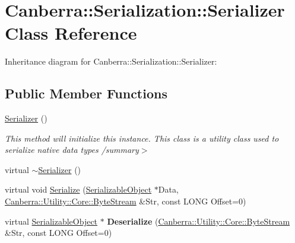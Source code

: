 \hypertarget{class_canberra_1_1_serialization_1_1_serializer}{}\section{Canberra\+:\+:Serialization\+:\+:Serializer Class Reference}
\label{class_canberra_1_1_serialization_1_1_serializer}


Inheritance diagram for Canberra\+:\+:Serialization\+:\+:Serializer\+:
\subsection*{Public Member Functions}
\begin{DoxyCompactItemize}
\item 
\mbox{\label{class_canberra_1_1_serialization_1_1_serializer_ac775b24bf79f1cad2ebba961d4da3931}} 
\hyperlink{class_canberra_1_1_serialization_1_1_serializer_ac775b24bf79f1cad2ebba961d4da3931}{Serializer} ()
\begin{DoxyCompactList}\small\item\em This method will initialize this instance. This class is a utility class used to serialize native data types /summary$>$ \end{DoxyCompactList}\item 
virtual \hyperlink{class_canberra_1_1_serialization_1_1_serializer_a13373231647e48d72dc5403a096882e1_a13373231647e48d72dc5403a096882e1}{$\sim$\+Serializer} ()
\item 
virtual void \hyperlink{class_canberra_1_1_serialization_1_1_serializer_af6bce5a6f7a663d86cb305ef34a5c631_af6bce5a6f7a663d86cb305ef34a5c631}{Serialize} (\hyperlink{class_canberra_1_1_serialization_1_1_serializable_object}{Serializable\+Object} $\ast$Data, \hyperlink{class_canberra_1_1_utility_1_1_core_1_1_byte_stream}{Canberra\+::\+Utility\+::\+Core\+::\+Byte\+Stream} \&Str, const L\+O\+NG Offset=0)
\item 
\mbox{\label{class_canberra_1_1_serialization_1_1_serializer_a38baa292cbe6b8d2e043b5d84e9f9b8f}} 
virtual \hyperlink{class_canberra_1_1_serialization_1_1_serializable_object}{Serializable\+Object} $\ast$ {\bfseries Deserialize} (\hyperlink{class_canberra_1_1_utility_1_1_core_1_1_byte_stream}{Canberra\+::\+Utility\+::\+Core\+::\+Byte\+Stream} \&Str, const L\+O\+NG Offset=0)
\end{DoxyCompactItemize}


